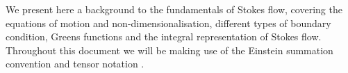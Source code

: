 \documentclass[12pt]{article}
\begin{document}
We present here a background to the fundamentals of Stokes flow, covering the equations of motion and non-dimensionalisation, different types of boundary condition, Greens functions and the integral representation of Stokes flow. Throughout this document we will be making use of the Einstein summation convention and tensor notation \citep{Riley06}.

\end{document}
